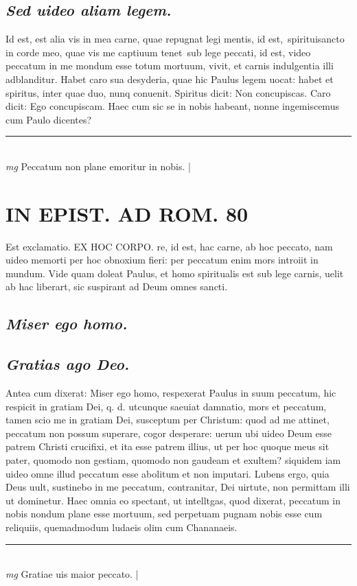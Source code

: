 \documentclass{article}
\begin{document}
\begin{pages}
\subsection*{\textit{Sed uideo aliam legem. }}\pstart Id est, est alia vis in mea carne, quae repugnat legi mentis, id est, spirituisancto in corde meo, quae vis me captiuum tenet sub lege peccati, id est, video peccatum in me mondum esse totum mortuum, vivit, et carnis indulgentia illi adblanditur. Habet caro sua desyderia, quae hic Paulus legem uocat: habet et spiritus, inter quae duo, nunq conuenit. Spiritus dicit: Non concupiscas. Caro dicit: Ego concupiscam. Haec cum sic se in nobis habeant, nonne ingemiscemus cum Paulo dicentes?  \pend
\vspace{0.5cm}\noindent
\vspace{0.2cm}\rule{1cm}{0.2pt}\\ 
\hspace{0.2cm}\textit{mg}
\footnotesize Peccatum non plane emoritur in nobis.  
\normalsize| 
\section*{IN EPIST. AD ROM.  80 }
\marginpar{[ p.]}
\marginpar{[ p.]}\pstart Est exclamatio. EX HOC CORPO.  re, id est, hac carne, ab hoc peccato, nam uideo memorti per hoc obnoxium fieri: per peccatum enim mors introiit in mundum. Vide quam doleat Paulus, et homo spiritualis est sub lege carnis, uelit ab hac liberart, sic suspirant ad Deum omnes sancti.   \pend
{}
{}
\subsection*{\textit{Miser ego homo. }}
{}
\subsection*{\textit{Gratias ago Deo. }}\pstart Antea cum dixerat: Miser ego homo, respexerat Paulus in suum peccatum, hic respicit in gratiam Dei, q. d. utcunque saeuiat damnatio, mors et peccatum, tamen scio me in gratiam Dei, susceptum per Christum: quod ad me attinet, peccatum non possum superare, cogor desperare: uerum ubi uideo Deum esse patrem Christi crucifixi, et ita esse patrem illius, ut per hoc quoque meus sit pater, quomodo non gestiam, quomodo non gaudeam et exultem? siquidem iam uideo omne illud peccatum esse abolitum et non imputari. Lubens ergo, quia Deus uult, sustinebo in me peccatum, contranitar, Dei uirtute, non permittam illi ut dominetur. Haec omnia eo spectant, ut intelltgas, quod dixerat, peccatum in nobis nondum plane esse mortuum, sed perpetuam pugnam nobis esse cum reliquiis, quemadmodum ludaeis olim cum Chananaeis.   \pend
\vspace{0.5cm}\noindent
\vspace{0.2cm}\rule{1cm}{0.2pt}\\ 
\hspace{0.2cm}\textit{mg}
\footnotesize Gratiae uis maior peccato.  
\normalsize| 

\end{pages}
\end{document}
